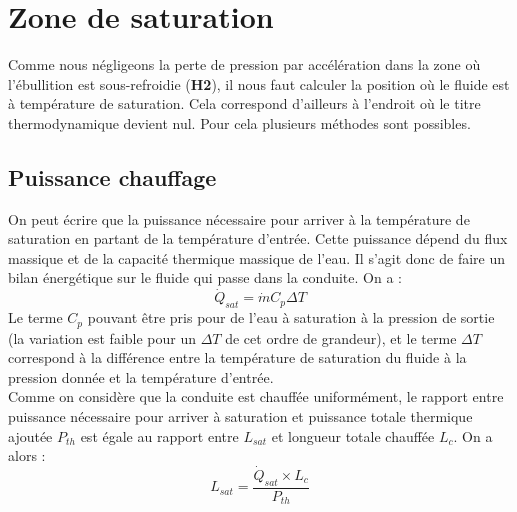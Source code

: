 \section{Zone de saturation\label{section:sat}}
Comme nous négligeons la perte de pression par accélération dans la zone où l'ébullition est sous-refroidie (\textbf{H2}), il nous faut calculer la position où le fluide est à température de saturation. Cela correspond d'ailleurs à l'endroit où le titre thermodynamique devient nul. Pour cela plusieurs méthodes sont possibles.

\subsection{Puissance chauffage}
On peut écrire que la puissance nécessaire pour arriver à la température de saturation en partant de la température d'entrée. Cette puissance dépend du flux massique et de la capacité thermique massique de l'eau. Il s'agit donc de faire un bilan énergétique sur le fluide qui passe dans la conduite. On a :
\begin{equation}
    \dot{Q}_{sat} = \dot{m} C_p \Delta T
\end{equation}
Le terme $C_p$ pouvant être pris pour de l'eau à saturation à la pression de sortie (la variation est faible pour un $\Delta T$ de cet ordre de grandeur), et le terme $\Delta T$ correspond à la différence entre la température de saturation du fluide à la pression donnée et la température d'entrée.\\ 

Comme on considère que la conduite est chauffée uniformément, le rapport entre puissance nécessaire pour arriver à saturation et puissance totale thermique ajoutée $P_{th}$ est égale au rapport entre $L_{sat}$ et longueur totale chauffée $L_c$. On a alors :
\begin{equation}
    L_{sat}= \frac{ \dot{Q}_{sat}\times L_c}{P_{th}}
\end{equation}

